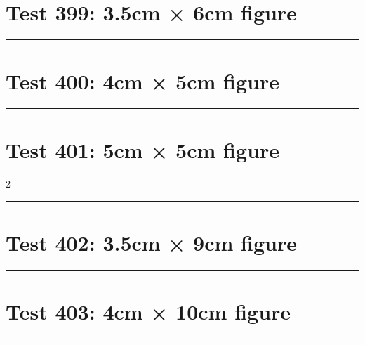 \documentclass[a4paper,11pt]{article}
\begin{document}
\section*{Test 399: 3.5cm × 6cm figure}
\begin{swarmwrap}%
  \begin{minipage}[t]{3cm}
    \centering
    \rule{\linewidth}{6cm}
  \end{minipage}%
\end{swarmwrap}%
\swarmwrapnext
\lipsum[61]
\lipsum[62]
\lipsum[63]
\lipsum[64]
\lipsum[65]
\lipsum[66]
\section*{Test 400: 4cm × 5cm figure}
\begin{swarmwrap}%
  \begin{minipage}[t]{4cm}
    \centering
    \rule{\linewidth}{5cm}
  \end{minipage}%
\end{swarmwrap}%
\swarmwrapnext
\lipsum[122]
\lipsum[123]
\lipsum[124]
\lipsum[125]
\lipsum[126]
\section*{Test 401: 5cm × 5cm figure}
\begin{multicols}{2}
  \begin{swarmwrap}%
    \begin{minipage}[t]{5cm}
      \centering
      \rule{\linewidth}{5cm}
    \end{minipage}%
  \end{swarmwrap}%
  \swarmwrapnext
  \lipsum[148]
  \lipsum[149]
  \lipsum[150]
  \lipsum[1]
  \lipsum[2]
\end{multicols}
\section*{Test 402: 3.5cm × 9cm figure}
\begin{swarmwrap}%
  \begin{minipage}[t]{3cm}
    \centering
    \rule{\linewidth}{9cm}
  \end{minipage}%
\end{swarmwrap}%
\swarmwrapnext
\lipsum[99]
\lipsum[100]
\lipsum[101]
\lipsum[102]
\lipsum[103]
\section*{Test 403: 4cm × 10cm figure}
\begin{swarmwrap}%
  \begin{minipage}[t]{4cm}
    \centering
    \rule{\linewidth}{10cm}
  \end{minipage}%
\end{swarmwrap}%
\swarmwrapnext
\lipsum[43]
\lipsum[44]
\lipsum[45]
\lipsum[46]
\lipsum[47]
\lipsum[48]
\end{document}
